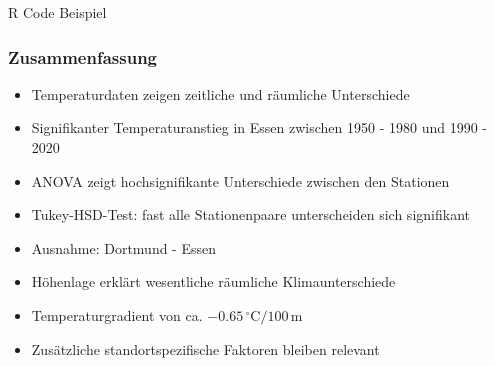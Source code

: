 \documentclass[10pt, aspectratio=169]{beamer}
\begin{document}
\begin{frame}[fragile]{R Code Beispiel}
    \frametitle{Zusammenfassung}
	\begin{itemize}
	    \item Temperaturdaten zeigen zeitliche und räumliche Unterschiede
	    \item Signifikanter Temperaturanstieg in Essen zwischen 1950 - 1980 und 1990 - 2020
	    \item ANOVA zeigt hochsignifikante Unterschiede zwischen den Stationen
	    \item Tukey-HSD-Test: fast alle Stationenpaare unterscheiden sich signifikant
	    \item[$\rightarrow$] Ausnahme: Dortmund - Essen
	    \item Höhenlage erklärt wesentliche räumliche Klimaunterschiede 
	    \item[$\rightarrow$] Temperaturgradient von ca. $-0.65\,^\circ\mathrm{C}/100\,\mathrm{m}$
	    \item[$\Rightarrow$] Zusätzliche standortspezifische Faktoren bleiben relevant
	\end{itemize}

\end{frame}
\end{document}
